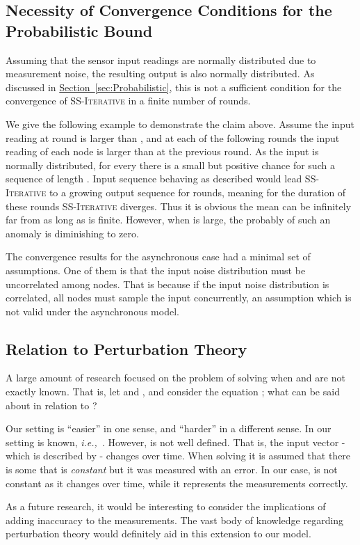 \documentclass[preprint,12pt]{elsarticle}
\newcommand{\ie}{\emph{i.e.,\ }}
\newcommand{\namedref}[2]{\hyperref[#2]{#1~\ref*{#2}}}
\newcommand{\sectionref}[1]{\namedref{Section}{#1}}
\newcommand{\syncAlg}{\textsc{SS-Iterative}\xspace}
\begin{document}
\subsection{Necessity of Convergence Conditions for the Probabilistic Bound}
Assuming that the sensor input readings are normally distributed due to measurement noise, the resulting output is also normally distributed. As discussed in \sectionref{sec:Probabilistic}, this is not a sufficient condition for the convergence of \syncAlg in a finite number of rounds.

We give the following example to demonstrate the claim above. Assume the input reading at round  is larger than , and at each of the following rounds the input reading of each node is larger than at the previous round. As the input is normally distributed, for every  there is a small but positive chance for such a sequence of length . Input sequence behaving as described would lead \syncAlg to a growing output sequence for  rounds, meaning for the duration of these rounds \syncAlg diverges. Thus it is obvious the mean can be infinitely far from  as long as  is finite. However, when  is large, the probably of such an anomaly is diminishing to zero.

The convergence results for the asynchronous case had a minimal set of assumptions. One of them is that the input noise distribution must be uncorrelated among nodes. That is because if the input noise distribution is correlated, all nodes
must sample the input concurrently, an assumption which is not valid under the asynchronous model. 

\subsection{Relation to Perturbation Theory}
A large amount of research focused on the problem of solving  when  and
 are not exactly known. That is, let  and
, and consider the equation
; what can be said about  in
relation to ?

Our setting is ``easier'' in one sense, and ``harder'' in a
different sense. In our setting  is known, \ie . However,  is not well defined. That is, the input
vector - which is described by  - changes over time.
When solving  it is assumed that there
is some  that is \emph{constant} but it was measured with an
error. In our case,  is not constant as it changes over time,
while it represents the measurements correctly.

As a future research, it would be interesting to consider the
implications of adding inaccuracy to the measurements. The vast
body of knowledge regarding perturbation theory would definitely
aid in this extension to our model.
\end{document}
